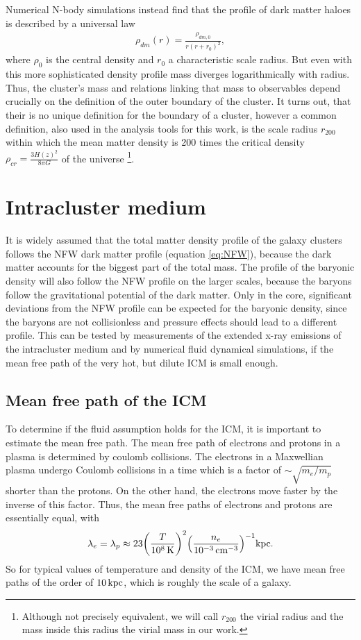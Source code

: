 Numerical N-body simulations instead find that the profile of dark matter haloes
is described by a universal law \citep{Navarro1997}
\begin{align}
\rho_{dm}(r)=\frac{\rho_{dm,0}}{r(r+r_0)^2},\label{eq:NFW}
\end{align}
where $\rho_0$ is the central density and $r_0$ a characteristic scale
radius.
But even with this more sophisticated density profile mass diverges
logarithmically with radius. Thus, the cluster’s mass and
relations linking that mass to observables depend crucially on the definition of
the outer boundary of the cluster. It turns out, that their is no unique
definition for the boundary of a cluster, however a common definition, also used
in the analysis tools for this work, is the scale radius $r_{200}$ within which
the mean matter density is 200 times the critical density 
$\rho_{cr}=\frac{3H(z)^2}{8\pi G}$ of the universe \footnote{Although not
precisely equivalent, we will call $r_{200}$ the virial radius and
the mass inside this radius the virial mass in our work.}. 

\section{Intracluster medium}
It is widely assumed that the total matter density profile of the galaxy
clusters follows the NFW dark matter profile (equation \eqref{eq:NFW}),
because the dark matter accounts for the biggest part of the total mass.
The profile of the baryonic density will also follow the NFW profile on
the larger scales, because the baryons follow the gravitational potential of
the dark matter. Only in the core, significant deviations from the NFW profile
can be expected for the baryonic density, since the baryons are not
collisionless and pressure effects should lead to a different profile.
This can be tested by measurements of the extended x-ray emissions of the
intracluster medium and by numerical fluid dynamical simulations, if the mean
free path of the very hot, but dilute ICM is small enough.  
\subsection{Mean free path of the ICM}\label{mfp}
To determine if the fluid assumption holds for the ICM, it is
important to estimate the mean free path. The mean free path of electrons and
protons in a plasma is determined by coulomb collisions. The electrons in a
Maxwellian plasma undergo Coulomb collisions in a time which is a factor of
$\sim \sqrt{m_e/m_p}$ shorter than the protons. On the other hand, the electrons
move faster by the inverse of this factor. Thus, the mean free paths of
electrons and protons are essentially equal, with \citep{Plionis2008}
\begin{align}
\lambda_e=\lambda_p \approx 23 
\lra{\frac{T}{\unit[10^8]{K}}}^2 
\lra{\frac{n_e}{\unit[10^{-3}]{cm^{-3}}}}^{-1} \unit{kpc}.
\end{align}
So for typical values of temperature and density of the ICM, we have mean free
paths of the order of $\unit[10]{kpc}$, which is roughly the scale of a galaxy.

